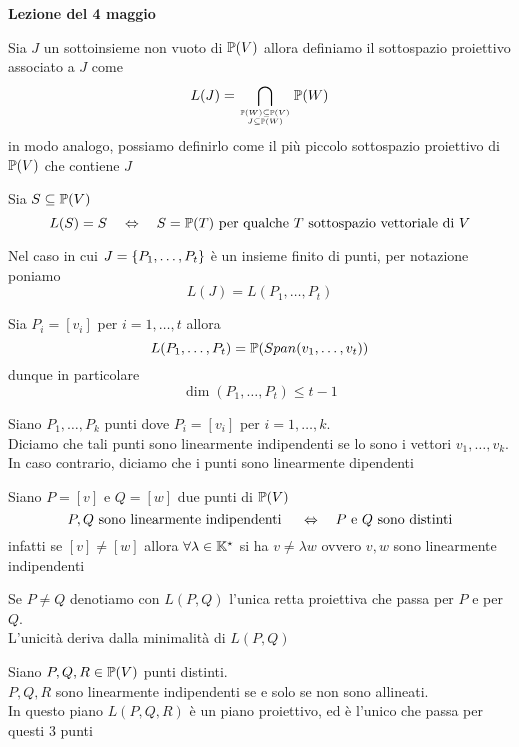 

\textbf{Lezione del 4 maggio}
\begin{defn}Sia $J$ un sottoinsieme non vuoto di $\mathbb{P}(V)$ allora definiamo il sottospazio proiettivo associato a $J$ come 
$$ L(J) =\bigcap_{{\mathbb{P}(W)\subseteq \mathbb{P}(V)} \atop{J \subseteq \mathbb{P}(W)}}\mathbb{P}(W)$$
in modo analogo, possiamo definirlo come il pi\`u piccolo sottospazio proiettivo di $\mathbb{P}(V)$ che contiene $J$
\end{defn}
\begin{oss}Sia $S\subseteq \mathbb{P}(V)$ 
$$ L(S) = S \quad \Leftrightarrow \quad S=\mathbb{P}(T) \text{ per qualche } T \text{ sottospazio vettoriale di } V $$
\end{oss}
\begin{defn}Nel caso in cui $J =\left\{  P_1, \dots , P_t \right\}$ \`e un insieme finito di punti, per notazione poniamo 
$$ L(J) =L(P_1, \dots , P_t)$$
\end{defn}
\begin{oss}Sia $P_i = [v_i]$ per $i=1, \dots, t $ allora
$$ L(P_1, \dots, P_t) = \mathbb{P} ( Span(v_1, \dots, v_t))$$ 
dunque in particolare
$$ \dim (P_1, \dots, P_t) \leq t-1$$ 
\end{oss}
\spazio
\begin{defn}Siano $P_1, \dots, P_k$ punti dove $P_i=[v_i]$ per $i=1, \dots, k$.\\
Diciamo che tali punti sono linearmente indipendenti se lo sono i vettori $v_1, \dots, v_k$.\\
In caso contrario, diciamo che i punti sono linearmente dipendenti
\end{defn}
\begin{oss}Siano $P=[v]$ e $Q=[w]$ due punti di $\mathbb{P}(V)$
$$ P, Q\text{ sono linearmente indipendenti } \quad \Leftrightarrow \quad P\text{ e } Q \text{ sono distinti}$$
infatti se $[v]\neq [w]$ allora $\forall \lambda\in \mathbb{K}^\star$ si ha $v\neq \lambda w$ ovvero $v,w$ sono linearmente indipendenti
\end{oss}
\begin{oss}Se $P\neq Q$ denotiamo con $L(P,Q)$ l'unica retta proiettiva che passa per $P$ e per $Q$.\\
L'unicit\`a deriva dalla minimalit\`a di $L(P,Q)$
\end{oss}
\begin{oss}Siano $P,Q,R\in \mathbb{P}(V)$ punti distinti.\\
$P,Q,R$ sono linearmente indipendenti se e solo se non sono allineati.\\
In questo piano $L(P,Q,R)$ \`e un piano proiettivo, ed \`e l'unico  che passa per questi $3$ punti
\end{oss}
